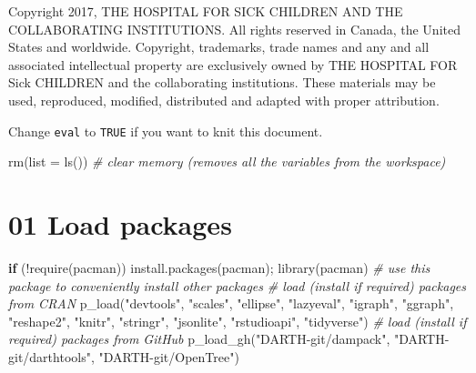 \documentclass[
]{article}
\newenvironment{Shaded}{\begin{snugshade}}{\end{snugshade}}
\newcommand{\AttributeTok}[1]{\textcolor[rgb]{0.77,0.63,0.00}{#1}}
\newcommand{\CommentTok}[1]{\textcolor[rgb]{0.56,0.35,0.01}{\textit{#1}}}
\newcommand{\ControlFlowTok}[1]{\textcolor[rgb]{0.13,0.29,0.53}{\textbf{#1}}}
\newcommand{\FunctionTok}[1]{\textcolor[rgb]{0.00,0.00,0.00}{#1}}
\newcommand{\NormalTok}[1]{#1}
\newcommand{\SpecialCharTok}[1]{\textcolor[rgb]{0.00,0.00,0.00}{#1}}
\newcommand{\StringTok}[1]{\textcolor[rgb]{0.31,0.60,0.02}{#1}}
\begin{document}
Copyright 2017, THE HOSPITAL FOR SICK CHILDREN AND THE COLLABORATING
INSTITUTIONS. All rights reserved in Canada, the United States and
worldwide. Copyright, trademarks, trade names and any and all associated
intellectual property are exclusively owned by THE HOSPITAL FOR Sick
CHILDREN and the collaborating institutions. These materials may be
used, reproduced, modified, distributed and adapted with proper
attribution.

\newpage

Change \texttt{eval} to \texttt{TRUE} if you want to knit this document.

\begin{Shaded}
\begin{Highlighting}[]
\FunctionTok{rm}\NormalTok{(}\AttributeTok{list =} \FunctionTok{ls}\NormalTok{())      }\CommentTok{\# clear memory (removes all the variables from the workspace)}
\end{Highlighting}
\end{Shaded}

\hypertarget{load-packages}{%
\section{01 Load packages}\label{load-packages}}

\begin{Shaded}
\begin{Highlighting}[]
\ControlFlowTok{if}\NormalTok{ (}\SpecialCharTok{!}\FunctionTok{require}\NormalTok{(}\StringTok{\textquotesingle{}pacman\textquotesingle{}}\NormalTok{)) }\FunctionTok{install.packages}\NormalTok{(}\StringTok{\textquotesingle{}pacman\textquotesingle{}}\NormalTok{); }\FunctionTok{library}\NormalTok{(pacman) }\CommentTok{\# use this package to conveniently install other packages}
\CommentTok{\# load (install if required) packages from CRAN}
\FunctionTok{p\_load}\NormalTok{(}\StringTok{"devtools"}\NormalTok{, }\StringTok{"scales"}\NormalTok{, }\StringTok{"ellipse"}\NormalTok{, }\StringTok{"lazyeval"}\NormalTok{, }\StringTok{"igraph"}\NormalTok{,  }\StringTok{"ggraph"}\NormalTok{, }\StringTok{"reshape2"}\NormalTok{, }\StringTok{"knitr"}\NormalTok{, }\StringTok{"stringr"}\NormalTok{, }\StringTok{"jsonlite"}\NormalTok{, }\StringTok{"rstudioapi"}\NormalTok{, }\StringTok{"tidyverse"}\NormalTok{)                                               }
\CommentTok{\# load (install if required) packages from GitHub}
\FunctionTok{p\_load\_gh}\NormalTok{(}\StringTok{"DARTH{-}git/dampack"}\NormalTok{, }\StringTok{"DARTH{-}git/darthtools"}\NormalTok{, }\StringTok{"DARTH{-}git/OpenTree"}\NormalTok{)}
\end{Highlighting}
\end{Shaded}
\end{document}
